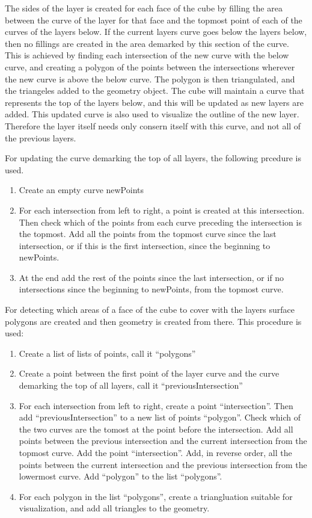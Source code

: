 \documentclass[a4paper,12pt]{report}
\begin{document}
The sides of the layer is created for each face of the cube by filling the area between the curve of the layer for that face and the topmost point of each of the curves of the layers below. If the current layers curve goes below the layers below, then no fillings are created in the area demarked by this section of the curve. This is achieved by finding each intersection of the new curve with the below curve, and creating a polygon of the points between the intersections wherever the new curve is above the below curve. The polygon is then triangulated, and the triangeles added to the geometry object. The cube will maintain a curve that represents the top of the layers below, and this will be updated as new layers are added. This updated curve is also used to visualize the outline of the new layer. Therefore the layer itself needs only consern itself with this curve, and not all of the previous layers.

For updating the curve demarking the top of all layers, the following prcedure is used. 
\begin{enumerate}
 \item Create an empty curve newPoints
 \item For each intersection from left to right, a point is created at this intersection. Then check which of the points from each curve preceding the intersection is the topmost. Add all the points from the topmost curve since the last intersection, or if this is the first intersection, since the beginning to newPoints.
 \item At the end add the rest of the points since the last intersection, or if no intersections since the beginning to newPoints, from the topmost curve.
\end{enumerate}

For detecting which areas of a face of the cube to cover with the layers surface polygons are created and then geometry is created from there. This procedure is used:
\begin{enumerate}
 \item Create a list of lists of points, call it ``polygons''
 \item Create a point between the first point of the layer curve and the curve demarking the top of all layers, call it ``previousIntersection''
 \item For each intersection from left to right, create a point ``intersection''. Then add ``previousIntersection'' to a new list of points ``polygon''. Check which of the two curves are the tomost at the point before the intersection. Add all points between the previous intersection and the current intersection from the topmost curve. Add the point ``intersection''. Add, in reverse order, all the points between the current intersection and the previous intersection from the lowermost curve. Add ``polygon'' to the list ``polygons''.
 \item For each polygon in the list ``polygons'', create a triangluation suitable for visualization, and add all triangles to the geometry.
\end{enumerate}
\end{document}
